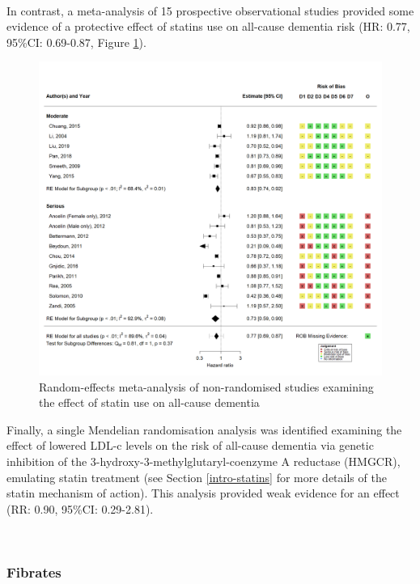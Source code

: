 \documentclass[a4paper, twoside]{templates/ociamthesis}
\begin{document}
~

In contrast, a meta-analysis of 15 prospective observational studies provided some evidence of a protective effect of statins use on all-cause dementia risk (HR: 0.77, 95\%CI: 0.69-0.87, Figure \ref{fig:obsStatinDementiaFig}).





\begin{figure}[H]
\includegraphics[width=1\linewidth]{figures/sys-rev/fp_obs_Statin-Ever_Dementia} \caption[Random-effects meta-analysis of statins on all-cause dementia]{Random-effects meta-analysis of non-randomised studies examining the effect of statin use on all-cause dementia}\label{fig:obsStatinDementiaFig}
\end{figure}

Finally, a single Mendelian randomisation analysis was identified examining the effect of lowered LDL-c levels on the risk of all-cause dementia via genetic inhibition of the 3-hydroxy-3-methylglutaryl-coenzyme A reductase (HMGCR), emulating statin treatment (see Section \ref{intro-statins} for more details of the statin mechanism of action). This analysis provided weak evidence for an effect (RR: 0.90, 95\%CI: 0.29-2.81).

~

\hypertarget{fibrates}{%
\subsubsection{Fibrates}\label{fibrates}}
\end{document}

